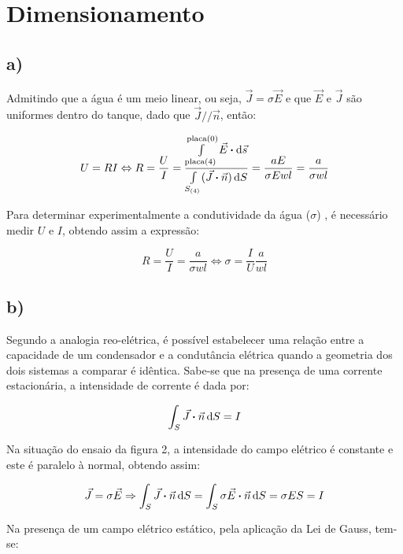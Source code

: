 \documentclass[portuguese, a4paper]{article}
\newcommand{\eq}{\Leftrightarrow} %
\begin{document}
	\section{Dimensionamento}
	\subsection{a)}

		\par
		Admitindo que a água é um meio linear, ou seja, $\vec{J} = \sigma \vec{E}$ e que $\vec{E}$ e $\vec{J}$ são uniformes dentro do tanque, dado que $\vec{J} // \vec{n}$, então:

		$$ U = RI \eq R = \dfrac{U}{I} = \dfrac{\int\limits_{\text{placa}(4)}^{\text{placa}(0)} \vec{E} \vdot \dd{\vec{s}}}{\int\limits_{S_{(4)}}(\vec{J} \vdot \vec{n})\dd{S}} = \dfrac{aE}{\sigma Ewl} = \dfrac{a}{\sigma wl}$$
		\par
		Para determinar experimentalmente a condutividade da água ($\sigma$) , é necessário medir $U$ e $I$, obtendo assim a expressão:

		$$ R = \frac{U}{I} = \dfrac{a}{\sigma wl} \eq \sigma = \frac{I}{U} \dfrac{a}{wl}$$

	\subsection{b)}

	\par
	Segundo a analogia reo-elétrica, é possível estabelecer uma relação entre a capacidade de um condensador e a condutância elétrica quando a geometria dos dois sistemas a comparar é idêntica.
	Sabe-se que na presença de uma corrente estacionária, a intensidade de corrente é dada por:

	\begin{align*}
		\int_S \vec{J} \vdot \vec{n}\dd{S} = I
	\end{align*}

	\par
	Na situação do ensaio da figura 2, a intensidade do campo elétrico é constante e este é paralelo à normal, obtendo assim:

	\begin{align*}
		\vec{J} = \sigma \vec{E} \Rightarrow \int_S \vec{J} \vdot \vec{n} \dd{S} = \int_S \sigma \vec{E} \vdot \vec{n} \dd{S}  = \sigma E S = I
	\end{align*}

	\par
	Na presença de um campo elétrico estático, pela aplicação da Lei de Gauss, tem-se:
\end{document}
